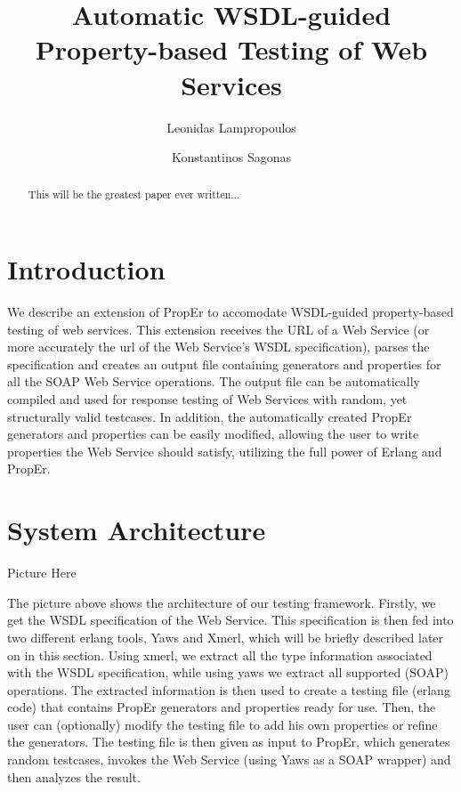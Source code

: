 \documentclass[submission,copyright,a4]{eptcs}
\title{Automatic WSDL-guided Property-based Testing of Web Services}
\author{Leonidas Lampropoulos \and Konstantinos Sagonas}
\begin{document}
\maketitle

\begin{abstract}
 This will be the greatest paper ever written...
\end{abstract}

\section{Introduction}

We describe an extension of PropEr to accomodate WSDL-guided property-based testing of web services. This extension receives the URL of a Web Service (or more accurately the url of the Web Service's WSDL specification), parses the specification and creates an output file containing generators and properties for all the SOAP Web Service operations. The output file can be automatically compiled and used for response testing of Web Services with random, yet structurally valid testcases. In addition, the automatically created PropEr generators and properties can be easily modified, allowing the user to write properties the Web Service should satisfy, utilizing the full power of Erlang and PropEr.

\section{System Architecture}

Picture Here

The picture above shows the architecture of our testing framework. Firstly, we get the WSDL specification of the Web Service. This specification is then fed into two different erlang tools, Yaws and Xmerl, which will be briefly described later on in this section. Using xmerl, we extract all the type information associated with the WSDL specification, while using yaws we extract all supported (SOAP) operations. The extracted information is then used to create a testing file (erlang code) that contains PropEr generators and properties ready for use. Then, the user can (optionally) modify the testing file to add his own properties or refine the generators. The testing file is then given as input to PropEr, which generates random testcases, invokes the Web Service (using Yaws as a SOAP wrapper) and then analyzes the result.

\end{document}
